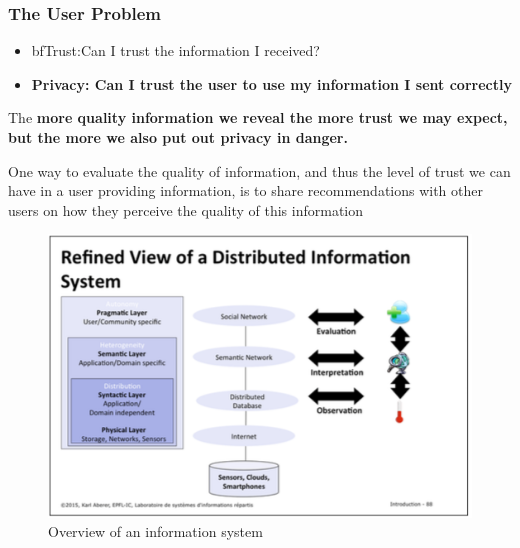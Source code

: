 \subsubsection{The User Problem}
\begin{itemize}
\item bf{Trust:}Can I trust the information I received?
\item \bf{Privacy:} Can I trust the user to use my information I sent correctly
\end{itemize}
The \bf{more quality information} we reveal the \bf{more trust} we may expect, but the \bf{more} we also put out \bf{privacy} in danger.

One way to evaluate the quality of information, and thus the level of trust we can have in a user providing information, is to share recommendations with other users on how they perceive the quality of this information

\begin{figure}[!ht]
\begin{center}
\includegraphics[width=1\linewidth]{figures/viewIS2.png}
\end{center}
\caption{Overview of an information system}
\end{figure}


